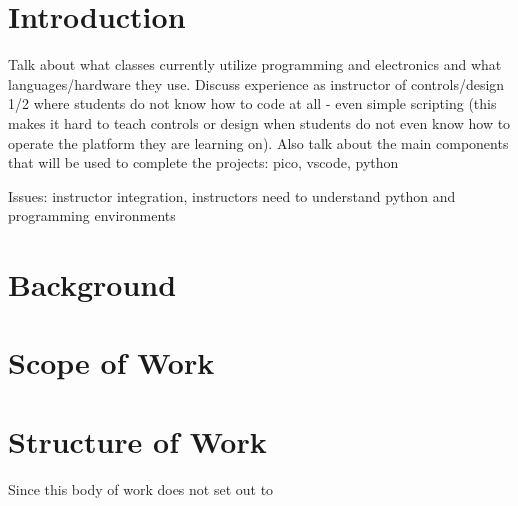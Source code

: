 \section{Introduction}
Talk about what classes currently utilize programming and electronics 
and what languages/hardware they use. Discuss experience as instructor 
of controls/design 1/2 where students do not know how to code at 
all - even simple scripting (this makes it hard to teach controls or 
design when students do not even know how to operate the platform they
are learning on). Also talk about the main components that will be 
used to complete the projects: pico, vscode, python


Issues: instructor integration, instructors need to understand python
and programming environments

\section{Background}



\section{Scope of Work}



\section{Structure of Work}

Since this body of work does not set out to 